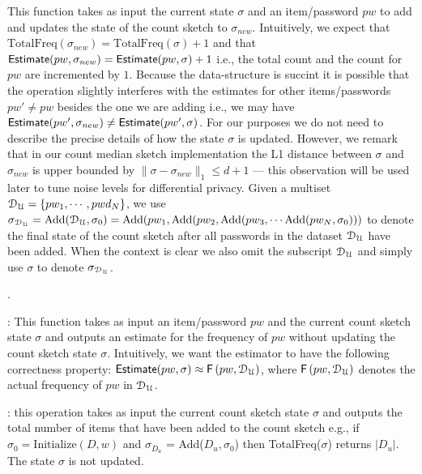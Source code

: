  {This function takes as input the current state $\sigma$ and an item/password $pw$ to add and updates the state of the count sketch to $\sigma_{new}$. Intuitively, we expect that  $\text{TotalFreq}(\sigma_{new})=\text{TotalFreq}(\sigma)+1$ and that  $\textsf{Estimate}(pw,\sigma_{new})=\textsf{Estimate}(pw,\sigma)+1$ i.e., the total count and the count for $pw$ are incremented by $1$. Because the data-structure is succint it is possible that the operation slightly interferes with the estimates for other items/passwords $pw'\neq pw$ besides the one we are adding i.e., we may have $\textsf{Estimate}(pw',\sigma_{new}) \neq \textsf{Estimate}(pw',\sigma)$. For our purposes we do not need to describe the precise details of how the state $\sigma$ is updated. However, we remark that in our count median sketch implementation the L1 distance between $\sigma$ and $\sigma_{new}$ is upper bounded by $\| \sigma -\sigma_{new}\|_1 \leq d+1$ --- this observation will be used later to tune noise levels for differential privacy.   Given a multiset $\mathcal{D}_{{\mathcal{U}}} = \{pw_1,\cdots,pwd_N\}$, we use $\sigma_{\mathcal{D}_{{\mathcal{U}}}} =  \text{Add}(\mathcal{D}_{{\mathcal{U}}},\sigma_0) \\= \text{Add}(pw_1, \text{Add}(pw_2,\text{Add}(pw_3,\cdots\text{Add}(pw_N,\sigma_0)))$ to denote the final state of the count sketch after all passwords in the dataset $\mathcal{D}_{{\mathcal{U}}}$ have been added.  } When the context is clear we also omit the subscript $\mathcal{D}_{{\mathcal{U}}}$ and simply use $\sigma$ to denote $\sigma_{\mathcal{D}_{{\mathcal{U}}}}$.



. \vspace*{-\baselineskip}

: { This function takes as input an item/password $pw$ and the current count sketch state $\sigma$ and outputs an estimate for the frequency of $pw$ without updating the count sketch state $\sigma$. Intuitively}, we want the estimator to have the following correctness property: $\textsf{Estimate}(pw,\sigma) \approx \mathsf{F}\left(pw, \mathcal{D}_{{\mathcal{U}}} \right)$, where $\mathsf{F}\left(pw, \mathcal{D}_{{\mathcal{U}}}\right)$ denotes the actual frequency of $pw$ in $\mathcal{D}_{{\mathcal{U}}}$.


: this operation takes as input the current count sketch state $\sigma$ and outputs the total number of items that have been added to the count sketch {e.g., if $\sigma_0=\text{Initialize}(D,w)$ and $\sigma_{D_u}$ = Add($D_u, \sigma_0$) then TotalFreq($\sigma$) returns $|D_u|$.} {The state $\sigma$ is not updated.}


